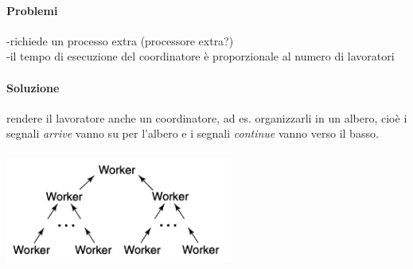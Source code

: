 \documentclass[10pt,a4paper]{article}
\begin{document}
\paragraph{Problemi}
-richiede un processo extra (processore extra?)\\
-il tempo di esecuzione del coordinatore è proporzionale al numero di lavoratori
\paragraph{Soluzione}
rendere il lavoratore anche un coordinatore, ad es. organizzarli in un albero, cioè i segnali \textit{arrive} vanno su per l'albero e i segnali \textit{continue} vanno verso il basso.\\ \\
\includegraphics[scale=0.6]{img/tree.png} \\ \\
\end{document}
